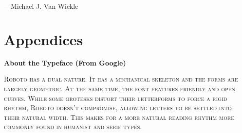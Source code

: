 \noindent\hspace*{2em} ---Michael J. Van Wickle
\vspace*{\fill}

\setlength{\parskip}{0in}

\tableofcontents
\newpage
\titleformat{\chapter}[frame]{\Large}{\filright\enspace\thechapter\enspace}{2.5cm}{\Large\bfseries\filcenter}
\setlength{\parskip}{0.4em}

\setcounter{section}{1}



\mainmatter
\renewcommand{\thefootnote}{\arabic{footnote}}











\part*{Appendices}
\appendix


\newpage
\backmatter

\titleformat{\chapter}[hang]{\Large}{\filright\enspace\thechapter\enspace}{2.5cm}{\Large\bfseries\filcenter}
\printbibliography

\newpage
{}
\vspace*{0.15\paperheight}
\begin{center}\bfseries
About the Typeface (From Google)
\end{center}
\noindent\hfil\parbox[c][1.1\height][c]{0.5\textwidth}{\small\scshape
Roboto has a dual nature.
It has a mechanical skeleton and the forms are largely geometric.
At the same time, the font features friendly and open curves.
While some grotesks distort their letterforms to force a rigid rhythm, Roboto doesn’t compromise, allowing letters to be settled into their natural width.
This makes for a more natural reading rhythm more commonly found in humanist and serif types.}
\vspace*{\fill}

